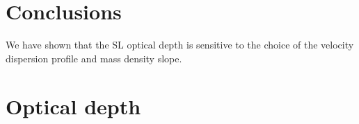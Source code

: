 \documentclass[aps,prd,twocolumn,superscriptaddress,groupedaddress,nofootinbib,showpacs,eqsecnum]{revtex4-1}
\begin{document}

\newpage
\section{Conclusions}

We have shown that the SL optical depth is sensitive to the choice of the velocity dispersion profile and mass density slope.

\newpage
\appendix


\section{Optical depth}\label{sec:optical_depth_derivation}
\end{document}
